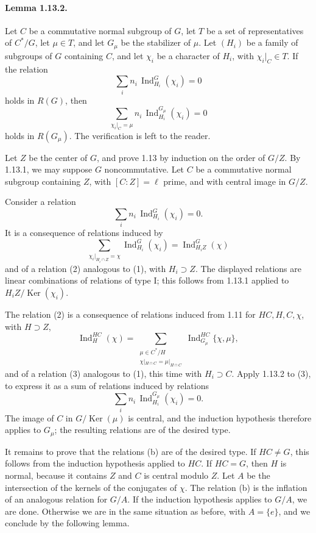 \documentclass[10pt]{article}
\newcommand{\Ind}{\operatorname{Ind}}
\providecommand{\Ker}{\operatorname{Ker}}
\providecommand{\Ind}{\operatorname{Ind}}
\providecommand{\Ker}{\operatorname{Ker}}
\begin{document}
\paragraph{Lemma 1.13.2.} Let \(C\) be a commutative normal subgroup of \(G\), let \(T\) be a set of representatives of \(C^*/G\), let \(\mu\in T\), and let \(G_\mu\) be the stabilizer of \(\mu\). Let \((H_i)\) be a family of subgroups of \(G\) containing \(C\), and let \(\chi_i\) be a character of \(H_i\), with \(\chi_i|_C\in T\). If the relation
\[
\sum_i n_i\,\Ind_{H_i}^G(\chi_i)=0
\]
holds in \(R(G)\), then
\[
\sum_{\chi_i|_C=\mu}
n_i\,\Ind_{H_i}^{G_\mu}(\chi_i)=0
\]
holds in \(R(G_\mu)\). The verification is left to the reader.

Let \(Z\) be the center of \(G\), and prove 1.13 by induction on the order of \(G/Z\). By 1.13.1, we may suppose \(G\) noncommutative. Let \(C\) be a commutative normal subgroup containing \(Z\), with \([C:Z]=\ell\) prime, and with central image in \(G/Z\).

Consider a relation
\[
\tag{1}
\sum_i n_i\,\Ind_{H_i}^G(\chi_i)=0.
\]
It is a consequence of relations induced by
\[
\sum_{\chi_i|_{H_i\cap Z}=\chi}\Ind_{H_i}^G(\chi_i)=\Ind_{H_iZ}^G(\chi)
\]
and of a relation (2) analogous to (1), with \(H_i\supset Z\). The displayed relations are linear combinations of relations of type I; this follows from 1.13.1 applied to \(H_iZ/\Ker(\chi_i)\).

The relation (2) is a consequence of relations induced from 1.11 for \(HC,H,C,\chi\), with \(H\supset Z\),
\[
\tag{b}
\Ind_H^{HC}(\chi)=
\sum_{\substack{\mu\in C^*/H\\ \chi|_{H\cap C}=\mu|_{H\cap C}}}
\Ind_{G_\mu}^{HC}\{\chi,\mu\},
\]
and of a relation (3) analogous to (1), this time with \(H_i\supset C\). Apply 1.13.2 to (3), to express it as a sum of relations induced by relations
\[
\sum_i n_i\,\Ind_{H_i}^{G_\mu}(\chi_i)=0.
\]
The image of \(C\) in \(G/\Ker(\mu)\) is central, and the induction hypothesis therefore applies to \(G_\mu\); the resulting relations are of the desired type.

It remains to prove that the relations (b) are of the desired type. If \(HC\ne G\), this follows from the induction hypothesis applied to \(HC\). If \(HC=G\), then \(H\) is normal, because it contains \(Z\) and \(C\) is central modulo \(Z\). Let \(A\) be the intersection of the kernels of the conjugates of \(\chi\). The relation (b) is the inflation of an analogous relation for \(G/A\). If the induction hypothesis applies to \(G/A\), we are done. Otherwise we are in the same situation as before, with \(A=\{e\}\), and we conclude by the following lemma.
\end{document}
